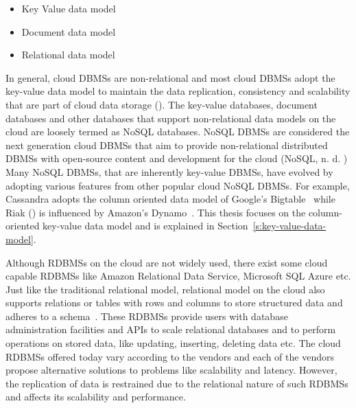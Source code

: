 \begin{itemize}
\item Key Value data model 

\item Document data model 

\item Relational data model
\end{itemize}

In general,   cloud \acp{DBMS} are non-relational and most cloud \acp{DBMS} 
adopt the key-value data model to maintain the data replication,   consistency
and scalability that are part of cloud data storage (). The
key-value databases,   document databases and other databases that support
non-relational data models on the cloud are loosely termed as \ac{NoSQL}
databases.  \ac{NoSQL} \acp{DBMS} are considered the next generation cloud
\acp{DBMS} that aim to provide non-relational distributed \acp{DBMS} with
open-source content and development for the cloud (\ac{NoSQL},   n. d. ) Many
\ac{NoSQL} \acp{DBMS},   that are inherently key-value \acp{DBMS},   have
evolved by adopting various features from other popular cloud \ac{NoSQL}
\acp{DBMS}.  For example,   Cassandra adopts the column oriented data model of
Google's Bigtable~\citep{bigtable} while Riak () is influenced by
Amazon's Dynamo~\citep{Dynamo}.  This thesis focuses on the column-oriented
key-value data model and is explained in Section~\ref{s:key-value-data-model}.

Although \acp{RDBMS} on the cloud are not widely used,   there exist some cloud
capable \acp{RDBMS} like Amazon Relational Data Service,   Microsoft SQL Azure
etc.  Just like the traditional relational model,   relational model on the
cloud also supports relations or tables with rows and columns to store
structured data and adheres to a schema~\citep{campbell,azure}.  These
\acp{RDBMS} provide users with database administration facilities and APIs to
scale relational databases and to perform operations on stored data,   like
updating,   inserting,   deleting data etc.  The cloud \acp{RDBMS} offered today
vary according to the vendors and each of the vendors propose alternative
solutions to problems like scalability and latency.  However,   the replication
of data is restrained due to the relational nature of such \acp{RDBMS} and 
affects its scalability and performance.

\newpage


